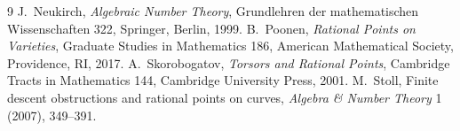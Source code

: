\documentclass[11pt]{article}
\begin{document}
\begin{thebibliography}{9}
 J.~Neukirch, \emph{Algebraic Number Theory}, Grundlehren der mathematischen Wissenschaften 322, Springer, Berlin, 1999.
 B.~Poonen, \emph{Rational Points on Varieties}, Graduate Studies in Mathematics 186, American Mathematical Society, Providence, RI, 2017.
 A.~Skorobogatov, \emph{Torsors and Rational Points}, Cambridge Tracts in Mathematics 144, Cambridge University Press, 2001.
 M.~Stoll, Finite descent obstructions and rational points on curves, \emph{Algebra \& Number Theory} 1 (2007), 349--391.
\end{thebibliography}
\end{document}
